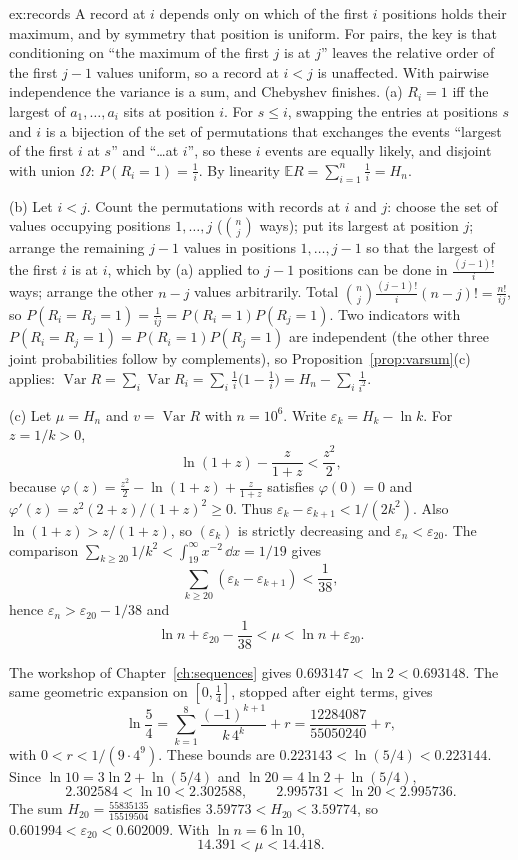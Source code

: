 \begin{solution}{ex:records}
\idea A record at $i$ depends only on which of the first $i$ positions holds their maximum, and by symmetry that position is uniform. For pairs, the key is that conditioning on ``the maximum of the first $j$ is at $j$'' leaves the relative order of the first $j-1$ values uniform, so a record at $i<j$ is unaffected. With pairwise independence the variance is a sum, and Chebyshev finishes.
\writeup (a) $R_i=1$ iff the largest of $a_1,\dots,a_i$ sits at position $i$. For $s\le i$, swapping the entries at positions $s$ and $i$ is a bijection of the set of permutations that exchanges the events ``largest of the first $i$ at $s$'' and ``\dots at $i$'', so these $i$ events are equally likely, and disjoint with union $\Omega$: $P(R_i=1)=\frac1i$. By linearity $\mathbb ER=\sum_{i=1}^n\frac1i=H_n$.

(b) Let $i<j$. Count the permutations with records at $i$ and $j$: choose the set of values occupying positions $1,\dots,j$ ($\binom nj$ ways); put its largest at position $j$; arrange the remaining $j-1$ values in positions $1,\dots,j-1$ so that the largest of the first $i$ is at $i$, which by (a) applied to $j-1$ positions can be done in $\frac{(j-1)!}i$ ways; arrange the other $n-j$ values arbitrarily. Total $\binom nj\frac{(j-1)!}i(n-j)!=\frac{n!}{ij}$, so $P(R_i=R_j=1)=\frac1{ij}=P(R_i=1)P(R_j=1)$. Two indicators with $P(R_i=R_j=1)=P(R_i=1)P(R_j=1)$ are independent (the other three joint probabilities follow by complements), so Proposition~\ref{prop:varsum}(c) applies: $\operatorname{Var}R=\sum_i\operatorname{Var}R_i=\sum_i\frac1i\big(1-\frac1i\big)=H_n-\sum_i\frac1{i^2}$.

(c) Let $\mu=H_n$ and $v=\operatorname{Var}R$ with $n=10^6$. Write $\varepsilon_k=H_k-\ln k$. For $z=1/k>0$,
\[
\ln(1+z)-\frac z{1+z}<\frac{z^2}2,
\]
because $\varphi(z)=\frac{z^2}2-\ln(1+z)+\frac z{1+z}$ satisfies $\varphi(0)=0$ and $\varphi'(z)=z^2(2+z)/(1+z)^2\ge0$. Thus $\varepsilon_k-\varepsilon_{k+1}<1/(2k^2)$. Also $\ln(1+z)>z/(1+z)$, so $(\varepsilon_k)$ is strictly decreasing and $\varepsilon_n<\varepsilon_{20}$. The comparison $\sum_{k\ge20}1/k^2<\int_{19}^\infty x^{-2}\,\dd x=1/19$ gives
\[
\sum_{k\ge20}(\varepsilon_k-\varepsilon_{k+1})<\frac1{38},
\]
hence $\varepsilon_n>\varepsilon_{20}-1/38$ and
\[
\ln n+\varepsilon_{20}-\frac1{38}<\mu<\ln n+\varepsilon_{20}.
\]

The workshop of Chapter~\ref{ch:sequences} gives $0.693147<\ln2<0.693148$. The same geometric expansion on $[0,\frac14]$, stopped after eight terms, gives
\[
\ln\frac54=\sum_{k=1}^{8}\frac{(-1)^{k+1}}{k\,4^k}+r=\frac{12284087}{55050240}+r,
\]
with $0<r<1/(9\cdot4^9)$. These bounds are $0.223143<\ln(5/4)<0.223144$. Since $\ln10=3\ln2+\ln(5/4)$ and $\ln20=4\ln2+\ln(5/4)$,
\[
2.302584<\ln10<2.302588,\qquad 2.995731<\ln20<2.995736.
\]
The sum $H_{20}=\frac{55835135}{15519504}$ satisfies $3.59773<H_{20}<3.59774$, so $0.601994<\varepsilon_{20}<0.602009$. With $\ln n=6\ln10$,
\[
14.391<\mu<14.418.
\]


\end{solution}
